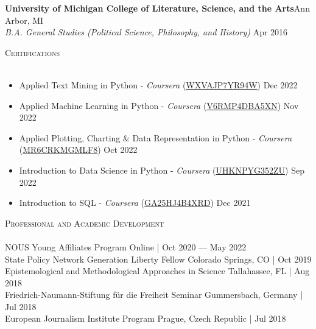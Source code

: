 \documentclass[a4paper,11pt]{article}
\newcommand{\lineunder} {
    \vspace*{-8pt} \\
    \hspace*{-18pt} \hrulefill \\
}
\newcommand{\header} [1] {
    {\hspace*{-18pt}\vspace*{6pt} \textsc{\large{#1}}}
    \vspace*{-6pt} \lineunder
}
\begin{document}
\textbf{University of Michigan College of Literature, Science, and the Arts}\hfill \faMapMarker\space Ann Arbor, MI\\
\textit{B.A. General Studies (Political Science, Philosophy, and History)} \hfill Apr 2016\\

\vspace{1mm}
\header{Certifications}
\begin{itemize}
    \item Applied Text Mining in Python - \emph{Coursera} (\href{https://www.coursera.org/account/accomplishments/verify/WXVAJP7YR94W}{WXVAJP7YR94W}) \hfill Dec 2022
    \item Applied Machine Learning in Python - \emph{Coursera} (\href{https://www.coursera.org/account/accomplishments/verify/V6RMP4DBA5XN}{V6RMP4DBA5XN}) \hfill Nov 2022
    \item Applied Plotting, Charting \& Data Representation in Python - \emph{Coursera} (\href{https://www.coursera.org/account/accomplishments/verify/MR6CRKMGMLF8}{MR6CRKMGMLF8}) \hfill Oct 2022
    \item Introduction to Data Science in Python - \emph{Coursera} (\href{https://www.coursera.org/account/accomplishments/verify/UHKNPYG352ZU}{UHKNPYG352ZU}) \hfill Sep 2022
    \item Introduction to SQL - \emph{Coursera} (\href{https://www.coursera.org/account/accomplishments/verify/GA25HJ4B4XRD}{GA25HJ4B4XRD}) \hfill Dec 2021
\end{itemize}
\vspace{1mm}
\header{Professional and Academic Development}

NOUS Young Affiliates Program \hfill \faMapMarker\space Online | Oct 2020 --- May 2022 \\

State Policy Network Generation Liberty Fellow \hfill \faMapMarker\space Colorado Springs, CO | Oct 2019 \\

Epistemological and Methodological Approaches in Science \hfill \faMapMarker\space Tallahassee, FL | Aug 2018\\

Friedrich-Naumann-Stiftung f\"{u}r die Freiheit Seminar \hfill \faMapMarker\space Gummersbach, Germany | Jul 2018 \\

European Journalism Institute Program \hfill \faMapMarker\space Prague, Czech Republic | Jul 2018 \\
\end{document}
